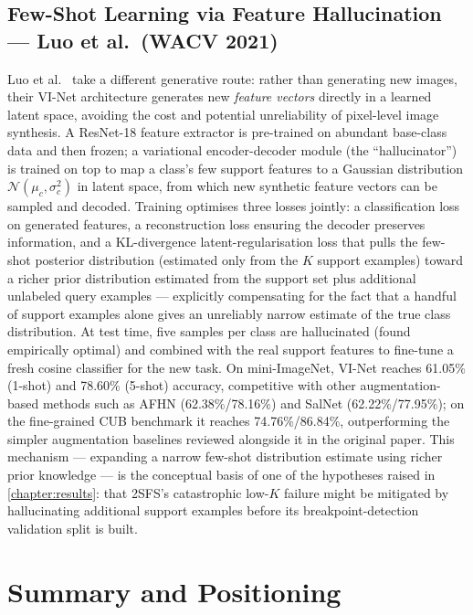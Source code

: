 \documentclass{iutbscthesis}
\begin{document}
\subsection{Few-Shot Learning via Feature Hallucination --- Luo et al.\ (WACV 2021)}
Luo et al.\ \cite{luo2021fewshot} take a different generative route: rather than generating new images, their VI-Net architecture generates new \emph{feature vectors} directly in a learned latent space, avoiding the cost and potential unreliability of pixel-level image synthesis. A ResNet-18 feature extractor is pre-trained on abundant base-class data and then frozen; a variational encoder-decoder module (the ``hallucinator'') is trained on top to map a class's few support features to a Gaussian distribution $\mathcal{N}(\mu_c, \sigma_c^2)$ in latent space, from which new synthetic feature vectors can be sampled and decoded. Training optimises three losses jointly: a classification loss on generated features, a reconstruction loss ensuring the decoder preserves information, and a KL-divergence latent-regularisation loss that pulls the few-shot posterior distribution (estimated only from the $K$ support examples) toward a richer prior distribution estimated from the support set plus additional unlabeled query examples --- explicitly compensating for the fact that a handful of support examples alone gives an unreliably narrow estimate of the true class distribution. At test time, five samples per class are hallucinated (found empirically optimal) and combined with the real support features to fine-tune a fresh cosine classifier for the new task. On mini-ImageNet, VI-Net reaches 61.05\% (1-shot) and 78.60\% (5-shot) accuracy, competitive with other augmentation-based methods such as AFHN (62.38\%/78.16\%) and SalNet (62.22\%/77.95\%); on the fine-grained CUB benchmark it reaches 74.76\%/86.84\%, outperforming the simpler augmentation baselines reviewed alongside it in the original paper. This mechanism --- expanding a narrow few-shot distribution estimate using richer prior knowledge --- is the conceptual basis of one of the hypotheses raised in \autoref{chapter:results}: that 2SFS's catastrophic low-$K$ failure might be mitigated by hallucinating additional support examples before its breakpoint-detection validation split is built.

\section{Summary and Positioning}
\end{document}
